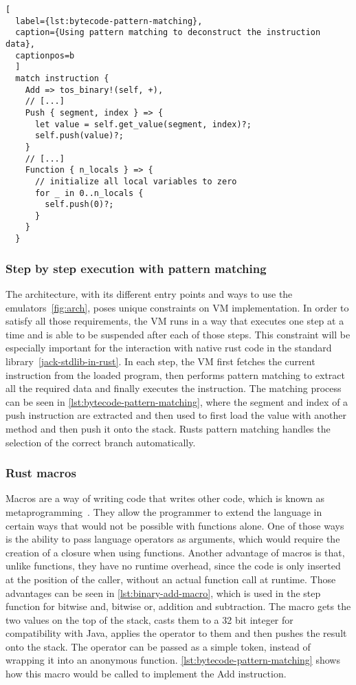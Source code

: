 \begin{lstlisting}[
  label={lst:bytecode-pattern-matching},
  caption={Using pattern matching to deconstruct the instruction data},
  captionpos=b
  ]
  match instruction {
    Add => tos_binary!(self, +),
    // [...]
    Push { segment, index } => {
      let value = self.get_value(segment, index)?;
      self.push(value)?;
    }
    // [...]
    Function { n_locals } => {
      // initialize all local variables to zero
      for _ in 0..n_locals {
        self.push(0)?;
      }
    }
  }
\end{lstlisting}

\subsubsection{Step by step execution with pattern matching} \label{step-by-step}
The architecture, with its different entry points and ways to use the emulators~\ref{fig:arch}, poses unique constraints on VM implementation. In order to satisfy all those requirements, the VM runs in a way that executes one step at a time and is able to be suspended after each of those steps. This constraint will be especially important for the interaction with native rust code in the standard library~\ref{jack-stdlib-in-rust}.
In each step, the VM first fetches the current instruction from the loaded program, then performs pattern matching to extract all the required data and finally executes the instruction.
The matching process can be seen in \cref{lst:bytecode-pattern-matching}, where the segment and index of a push instruction are extracted and then used to first load the value with another method and then push it onto the stack.
Rusts pattern matching handles the selection of the correct branch automatically.

\subsubsection{Rust macros} \label{macros}
Macros are a way of writing code that writes other code, which is known as metaprogramming~\cite[Chapter~19.5]{klabnik2019rust}.
They allow the programmer to extend the language in certain ways that would not be possible with functions alone.
One of those ways is the ability to pass language operators as arguments, which would require the creation of a closure when using functions.
Another advantage of macros is that, unlike functions, they have no runtime overhead, since the code is only inserted at the position of the caller, without an actual function call at runtime.
Those advantages can be seen in \cref{lst:binary-add-macro}, which is used in the step function for bitwise and, bitwise or, addition and subtraction. The macro gets the two values on the top of the stack, casts them to a 32 bit integer for compatibility with Java, applies the operator to them and then pushes the result onto the stack.
The operator can be passed as a simple token, instead of wrapping it into an anonymous function.
\cref{lst:bytecode-pattern-matching} shows how this macro would be called to implement the Add instruction.

